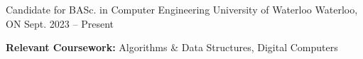 
\begin{cventries}
  \cventry
    {Candidate for BASc. in Computer Engineering} %
    {University of Waterloo} %
    {Waterloo, ON} %
    {Sept. 2023 -- Present} %
    {
      \begin{cvitems} %
         \item {\textbf{Relevant Coursework:} Algorithms \& Data Structures, Digital Computers}
      \end{cvitems}
    }
\end{cventries}
